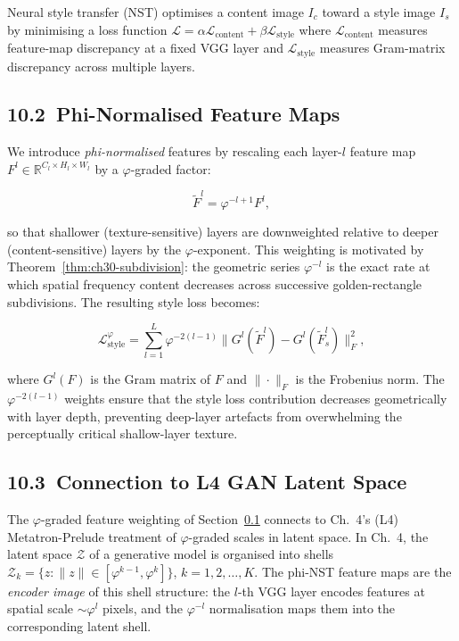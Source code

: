 Neural style transfer (NST) \cite{cohenor_stylization}
optimises a content image $I_c$ toward a style
image $I_s$ by minimising a loss function
$\mathcal{L} = \alpha \mathcal{L}_{\text{content}}
+ \beta \mathcal{L}_{\text{style}}$
where $\mathcal{L}_{\text{content}}$ measures
feature-map discrepancy at a fixed VGG layer and
$\mathcal{L}_{\text{style}}$ measures Gram-matrix
discrepancy across multiple layers.

\subsection{10.2\ Phi-Normalised Feature
  Maps}\label{subsec:ch30-phi-norm}

We introduce \emph{phi-normalised} features by
rescaling each layer-$l$ feature map $F^l \in
\mathbb{R}^{C_l \times H_l \times W_l}$ by a
$\varphi$-graded factor:

\[\tilde{F}^l = \varphi^{-l+1} F^l,\]

so that shallower (texture-sensitive) layers are
downweighted relative to deeper (content-sensitive)
layers by the $\varphi$-exponent.  This weighting
is motivated by Theorem~\ref{thm:ch30-subdivision}:
the geometric series $\varphi^{-l}$ is the exact
rate at which spatial frequency content decreases
across successive golden-rectangle subdivisions.
The resulting style loss becomes:

\[\mathcal{L}^{\varphi}_{\text{style}}
  = \sum_{l=1}^{L} \varphi^{-2(l-1)}
    \bigl\| G^l(\tilde{F}^l)
      - G^l(\tilde{F}^l_s) \bigr\|_F^2,\]

where $G^l(F)$ is the Gram matrix of
$F$ and $\|\cdot\|_F$ is the Frobenius norm.
The $\varphi^{-2(l-1)}$ weights ensure that the
style loss contribution decreases geometrically
with layer depth, preventing deep-layer artefacts
from overwhelming the perceptually critical
shallow-layer texture.

\subsection{10.3\ Connection to L4 GAN Latent
  Space}\label{subsec:ch30-nst-l4}

The $\varphi$-graded feature weighting of
Section~\ref{subsec:ch30-phi-norm} connects to
Ch.~4's (L4) Metatron-Prelude treatment of
$\varphi$-graded scales in latent space.  In Ch.~4,
the latent space $\mathcal{Z}$ of a generative
model is organised into shells $\mathcal{Z}_k
= \{z : \|z\| \in [\varphi^{k-1}, \varphi^k]\}$,
$k = 1, 2, \ldots, K$.  The phi-NST feature maps
are the \emph{encoder image} of this shell
structure: the $l$-th VGG layer encodes features
at spatial scale $\sim \varphi^l$ pixels, and the
$\varphi^{-l}$ normalisation maps them into the
corresponding latent shell.

